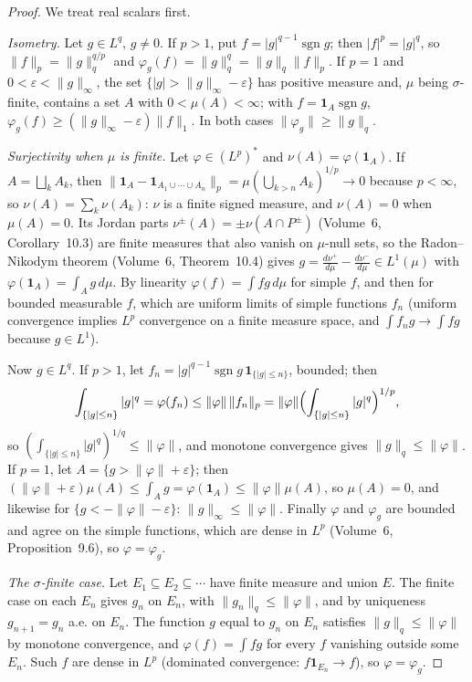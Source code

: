 \begin{proof}
We treat real scalars first.

\emph{Isometry.} Let $g\in L^q$, $g\ne0$. If $p>1$, put $f=|g|^{q-1}\operatorname{sgn}g$; then $|f|^p=|g|^q$, so $\|f\|_p=\|g\|_q^{q/p}$ and $\varphi_g(f)=\|g\|_q^q=\|g\|_q\|f\|_p$. If $p=1$ and $0<\varepsilon<\|g\|_\infty$, the set
$\{|g|>\|g\|_\infty-\varepsilon\}$ has positive measure and, $\mu$ being $\sigma$-finite, contains a set $A$ with $0<\mu(A)<\infty$; with $f=\mathbf 1_A\operatorname{sgn}g$, $\varphi_g(f)\ge(\|g\|_\infty-\varepsilon)\|f\|_1$. In both
cases $\|\varphi_g\|\ge\|g\|_q$.

\emph{Surjectivity when $\mu$ is finite.} Let $\varphi\in(L^p)^*$ and $\nu(A)=\varphi(\mathbf 1_A)$. If $A=\bigsqcup_kA_k$, then $\|\mathbf 1_A-\mathbf 1_{A_1\cup\cdots\cup A_n}\|_p=\mu(\bigcup_{k>n}A_k)^{1/p}\to0$ because $p<\infty$, so
$\nu(A)=\sum_k\nu(A_k)$: $\nu$ is a finite signed measure, and $\nu(A)=0$ when $\mu(A)=0$. Its Jordan parts $\nu^\pm(A)=\pm\nu(A\cap P^\pm)$ (Volume~6, Corollary~10.3) are finite measures that also vanish on $\mu$-null sets, so the
Radon--Nikodym theorem (Volume~6, Theorem~10.4) gives $g=\frac{d\nu^+}{d\mu}-\frac{d\nu^-}{d\mu}\in L^1(\mu)$ with $\varphi(\mathbf 1_A)=\int_Ag\,d\mu$. By linearity $\varphi(f)=\int fg\,d\mu$ for simple $f$, and then for bounded measurable
$f$, which are uniform limits of simple functions $f_n$ (uniform convergence implies $L^p$ convergence on a finite measure space, and $\int f_ng\to\int fg$ because $g\in L^1$).

Now $g\in L^q$. If $p>1$, let $f_n=|g|^{q-1}\operatorname{sgn}g\,\mathbf 1_{\{|g|\le n\}}$, bounded; then
\[\int_{\{|g|\le n\}}|g|^q=\varphi(f_n)\le\|\varphi\|\,\|f_n\|_p=\|\varphi\|\Bigl(\int_{\{|g|\le n\}}|g|^q\Bigr)^{1/p},\]
so $(\int_{\{|g|\le n\}}|g|^q)^{1/q}\le\|\varphi\|$, and monotone convergence gives $\|g\|_q\le\|\varphi\|$. If $p=1$, let $A=\{g>\|\varphi\|+\varepsilon\}$; then $(\|\varphi\|+\varepsilon)\mu(A)\le\int_Ag=\varphi(\mathbf 1_A)\le\|\varphi\|\mu(A)$,
so $\mu(A)=0$, and likewise for $\{g<-\|\varphi\|-\varepsilon\}$: $\|g\|_\infty\le\|\varphi\|$. Finally $\varphi$ and $\varphi_g$ are bounded and agree on the simple functions, which are dense in $L^p$ (Volume~6, Proposition~9.6), so
$\varphi=\varphi_g$.

\emph{The $\sigma$-finite case.} Let $E_1\subseteq E_2\subseteq\cdots$ have finite measure and union $E$. The finite case on each $E_n$ gives $g_n$ on $E_n$, with $\|g_n\|_q\le\|\varphi\|$, and by uniqueness $g_{n+1}=g_n$ a.e. on $E_n$. The
function $g$ equal to $g_n$ on $E_n$ satisfies $\|g\|_q\le\|\varphi\|$ by monotone convergence, and $\varphi(f)=\int fg$ for every $f$ vanishing outside some $E_n$. Such $f$ are dense in $L^p$ (dominated convergence:
$f\mathbf 1_{E_n}\to f$), so $\varphi=\varphi_g$.


\end{proof}
